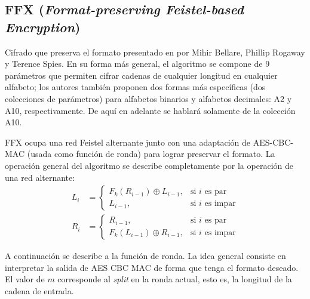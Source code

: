 %
%

\subsection{FFX (\textit{Format-preserving Feistel-based Encryption})}

Cifrado que preserva el formato presentado en \cite{ffx_1} por Mihir Bellare,
Phillip Rogaway y Terence Spies.  En su forma más general, el algoritmo se
compone de 9 parámetros que permiten cifrar cadenas de cualquier longitud en
cualquier alfabeto; los autores también proponen dos formas más específicas (dos
colecciones de parámetros) para alfabetos binarios y alfabetos decimales: A2 y
A10, respectivamente. De aquí en adelante se hablará solamente de la colección
A10.


FFX ocupa una red Feistel alternante junto con una adaptación de AES-CBC-MAC
(usada como función de ronda) para lograr preservar el formato. La operación
general del algoritmo se describe completamente por la operación de una red
alternante:
\begin{equation}
  \begin{split}
    L_{i} &=
    \begin{cases}
      F_k(R_{i - 1}) \oplus L_{i - 1},  & \text{si } i \text{ es par} \\
      L_{i - 1},                        & \text{si } i \text{ es impar}
    \end{cases}
    \\
    R_{i} &=
    \begin{cases}
      R_{i - 1},                        & \text{si } i \text{ es par} \\
      F_k(L_{i - 1}) \oplus R_{i - 1},  & \text{si } i \text{ es impar}
    \end{cases}
  \end{split}
\end{equation}


A continuación se describe a la función de ronda. La idea general
consiste en interpretar la salida de AES CBC MAC de forma que tenga el formato
deseado. El valor de $ m $ corresponde al \textit{split} en la ronda actual,
esto es, la longitud de la cadena de entrada.


